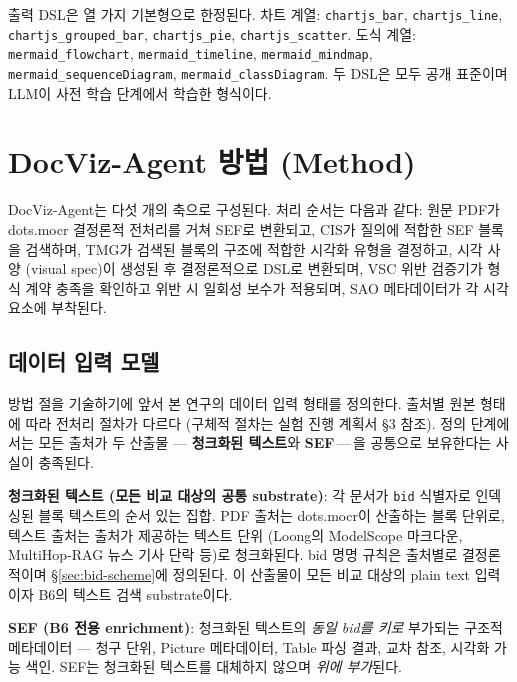 \documentclass[11pt]{article}
\begin{document}
출력 DSL은 열 가지 기본형으로 한정된다. 차트 계열: \texttt{chartjs\_bar}, \texttt{chartjs\_line}, \texttt{chartjs\_grouped\_bar}, \texttt{chartjs\_pie}, \texttt{chartjs\_scatter}. 도식 계열: \texttt{mermaid\_flowchart}, \texttt{mermaid\_timeline}, \texttt{mermaid\_mindmap}, \texttt{mermaid\_sequenceDiagram}, \texttt{mermaid\_classDiagram}. 두 DSL은 모두 공개 표준이며 LLM이 사전 학습 단계에서 학습한 형식이다.

\section{DocViz-Agent 방법 (Method)}

DocViz-Agent는 다섯 개의 축으로 구성된다. 처리 순서는 다음과 같다: 원문 PDF가 dots.mocr 결정론적 전처리를 거쳐 SEF로 변환되고, CIS가 질의에 적합한 SEF 블록을 검색하며, TMG가 검색된 블록의 구조에 적합한 시각화 유형을 결정하고, 시각 사양 (visual spec)이 생성된 후 결정론적으로 DSL로 변환되며, VSC 위반 검증기가 형식 계약 충족을 확인하고 위반 시 일회성 보수가 적용되며, SAO 메타데이터가 각 시각 요소에 부착된다.

\subsection{데이터 입력 모델}
\label{sec:layered}

방법 절을 기술하기에 앞서 본 연구의 데이터 입력 형태를 정의한다. 출처별 원본 형태에 따라 전처리 절차가 다르다 (구체적 절차는 실험 진행 계획서 \S 3 참조). 정의 단계에서는 모든 출처가 두 산출물 — \textbf{청크화된 텍스트}와 \textbf{SEF}\,—\,을 공통으로 보유한다는 사실이 충족된다.

\textbf{청크화된 텍스트 (모든 비교 대상의 공통 substrate)}: 각 문서가 \texttt{bid} 식별자로 인덱싱된 블록 텍스트의 순서 있는 집합. PDF 출처는 dots.mocr이 산출하는 블록 단위로, 텍스트 출처는 출처가 제공하는 텍스트 단위 (Loong의 ModelScope 마크다운, MultiHop-RAG 뉴스 기사 단락 등)로 청크화된다. bid 명명 규칙은 출처별로 결정론적이며 \S\ref{sec:bid-scheme}에 정의된다. 이 산출물이 모든 비교 대상의 plain text 입력이자 B6의 텍스트 검색 substrate이다.

\textbf{SEF (B6 전용 enrichment)}: 청크화된 텍스트의 \emph{동일 bid를 키로} 부가되는 구조적 메타데이터 — 청구 단위, Picture 메타데이터, Table 파싱 결과, 교차 참조, 시각화 가능 색인. SEF는 청크화된 텍스트를 대체하지 않으며 \emph{위에 부가}된다.
\end{document}
